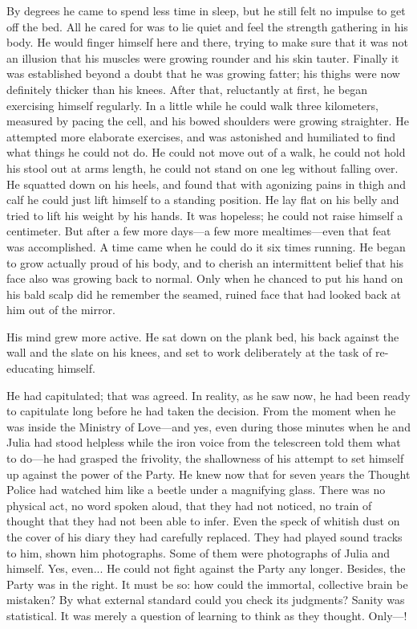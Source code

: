 By degrees he came to spend less time in sleep, but he still felt no
impulse to get off the bed. All he cared for was to lie quiet and feel
the strength gathering in his body. He would finger himself here and
there, trying to make sure that it was not an illusion that his muscles
were growing rounder and his skin tauter. Finally it was established
beyond a doubt that he was growing fatter; his thighs were now
definitely thicker than his knees. After that, reluctantly at first, he
began exercising himself regularly. In a little while he could walk
three kilometers, measured by pacing the cell, and his bowed shoulders
were growing straighter. He attempted more elaborate exercises, and was
astonished and humiliated to find what things he could not do. He could
not move out of a walk, he could not hold his stool out at
arm\textquotesingle s length, he could not stand on one leg without
falling over. He squatted down on his heels, and found that with
agonizing pains in thigh and calf he could just lift himself to a
standing position. He lay flat on his belly and tried to lift his weight
by his hands. It was hopeless; he could not raise himself a centimeter.
But after a few more days---a few more mealtimes---even that feat was
accomplished. A time came when he could do it six times running. He
began to grow actually proud of his body, and to cherish an intermittent
belief that his face also was growing back to normal. Only when he
chanced to put his hand on his bald scalp did he remember the seamed,
ruined face that had looked back at him out of the mirror.

His mind grew more active. He sat down on the plank bed, his back
against the wall and the slate on his knees, and set to work
deliberately at the task of re-educating himself.

He had capitulated; that was agreed. In reality, as he saw now, he had
been ready to capitulate long before he had taken the decision. From the
moment when he was inside the Ministry of Love---and yes, even during
those minutes when he and Julia had stood helpless while the iron voice
from the telescreen told them what to do---he had grasped the frivolity,
the shallowness of his attempt to set himself up against the power of
the Party. He knew now that for seven years the Thought Police had
watched him like a beetle under a magnifying glass. There was no
physical act, no word spoken aloud, that they had not noticed, no train
of thought that they had not been able to infer. Even the speck of
whitish dust on the cover of his diary they had carefully replaced. They
had played sound tracks to him, shown him photographs. Some of them were
photographs of Julia and himself. Yes, even... He could not fight
against the Party any longer. Besides, the Party was in the right. It
must be so: how could the immortal, collective brain be mistaken? By
what external standard could you check its judgments? Sanity was
statistical. It was merely a question of learning to think as they
thought. Only---!

